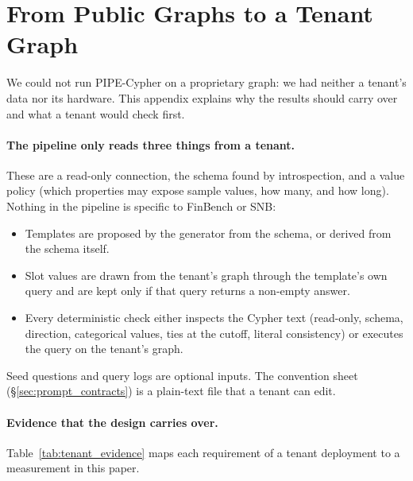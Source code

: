 
\section{From Public Graphs to a Tenant Graph}\label{app:tenant}
We could not run PIPE-Cypher on a proprietary graph: we had neither a tenant's data nor its hardware. This appendix explains why the results should carry over and what a tenant would check first.

\paragraph{The pipeline only reads three things from a tenant.} These are a read-only connection, the schema found by introspection, and a value policy (which properties may expose sample values, how many, and how long). Nothing in the pipeline is specific to FinBench or SNB:
\begin{itemize}
\item Templates are proposed by the generator from the schema, or derived from the schema itself.
\item Slot values are drawn from the tenant's graph through the template's own query and are kept only if that query returns a non-empty answer.
\item Every deterministic check either inspects the Cypher text (read-only, schema, direction, categorical values, ties at the  cutoff, literal consistency) or executes the query on the tenant's graph.
\end{itemize}
Seed questions and query logs are optional inputs. The convention sheet (\S\ref{sec:prompt_contracts}) is a plain-text file that a tenant can edit.

\paragraph{Evidence that the design carries over.} Table~\ref{tab:tenant_evidence} maps each requirement of a tenant deployment to a measurement in this paper.

